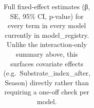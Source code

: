 \documentclass[
  12pt,
  a4paper,
]{scrbook}
\begin{document}
{

\begin{longtable}[]{@{}
  >{\raggedright\arraybackslash}p{}
  >{\raggedright\arraybackslash}p{}
  >{\raggedright\arraybackslash}p{}
  >{\raggedright\arraybackslash}p{}
  >{\raggedright\arraybackslash}p{}
  >{\raggedright\arraybackslash}p{}
  >{\raggedright\arraybackslash}p{}
  >{\raggedleft\arraybackslash}p{}
  >{\raggedleft\arraybackslash}p{}
  >{\raggedleft\arraybackslash}p{}
  >{\raggedleft\arraybackslash}p{}
  >{\raggedleft\arraybackslash}p{}
  >{\raggedleft\arraybackslash}p{}
  >{\raggedleft\arraybackslash}p{}@{}}

\caption{\label{tbl-models-summary-full-supp}Full fixed-effect estimates
(β, SE, 95\% CI, p-value) for every term in every model currently in
model\_registry. Unlike the interaction-only summary above, this
surfaces covariate effects (e.g.~Substrate\_index\_after, Season)
directly rather than requiring a one-off check per model.}

\tabularnewline


\end{longtable}}
\end{document}
